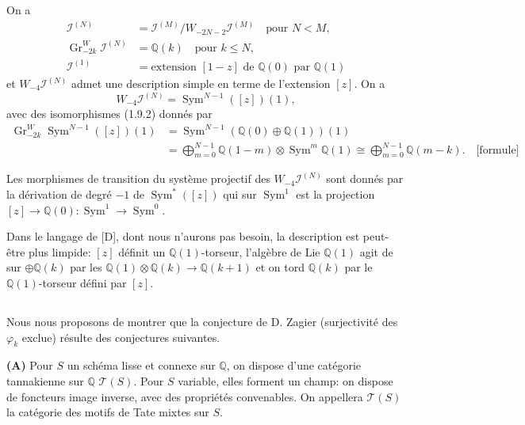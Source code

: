 \documentclass[12pt,a4paper]{article}
\theoremstyle{plain}
\theoremstyle{definition}
\theoremstyle{remark}
\DeclareMathOperator{\Sym}{Sym}
\newcommand{\Q}{\mathbb{Q}}
\begin{document}
On a
\begin{align}
\mathcal{I}^{(N)} &= \mathcal{I}^{(M)}/W_{-2N-2}\mathcal{I}^{(M)} \quad \text{pour }N<M, \tag{1.9.1}\label{eq:1.9.1}\\
\operatorname{Gr}^W_{-2k}\mathcal{I}^{(N)} &= \Q(k) \quad \text{pour }k\leq N, \tag{1.9.2}\label{eq:1.9.2}\\
\mathcal{I}^{(1)} &= \text{extension }[1-z]\text{ de }\Q(0)\text{ par }\Q(1) \tag{1.9.3}\label{eq:1.9.3}
\end{align}
et $W_{-4}\mathcal{I}^{(N)}$ admet une description simple en terme de l'extension $[z]$. On a
\begin{equation*}
W_{-4}\mathcal{I}^{(N)} = \Sym^{N-1}([z])(1),
\end{equation*}
avec des isomorphismes (1.9.2) donn{\'e}s par
\begin{equation}\label{eq:1.9.4}
\begin{aligned}
\operatorname{Gr}^W_{-2k}\Sym^{N-1}([z])(1) &= \Sym^{N-1}(\Q(0)\oplus\Q(1))(1)\\
&= \bigoplus_{m=0}^{N-1}\Q(1-m)\otimes\Sym^m\Q(1) \cong \bigoplus_{m=0}^{N-1}\Q(m-k).\quad \text{[formule]}
\end{aligned}
\tag{1.9.4}
\end{equation}

Les morphismes de transition du syst{\`e}me projectif des $W_{-4}\mathcal{I}^{(N)}$ sont donn{\'e}s par la d{\'e}rivation de degr{\'e} $-1$ de $\Sym^*([z])$ qui sur $\Sym^1$ est la projection $[z]\to\Q(0):\Sym^1\to\Sym^0$.

Dans le langage de [D], dont nous n'aurons pas besoin, la description est peut-\^etre plus limpide: $[z]$ d{\'e}finit un $\Q(1)$-torseur, l'alg{\`e}bre de Lie $\Q(1)$ agit de sur $\oplus\Q(k)$ par les $\Q(1)\otimes\Q(k)\to\Q(k+1)$ et on tord $\Q(k)$ par le $\Q(1)$-torseur d{\'e}fini par $[z]$.

\subsection{}

Nous nous proposons de montrer que la conjecture de D. Zagier (surjectivit{\'e} des $\varphi_k$ exclue) r{\'e}sulte des conjectures suivantes.

\textbf{(A)} Pour $S$ un sch{\'e}ma lisse et connexe sur $\Q$, on dispose d'une cat{\'e}gorie tannakienne sur $\Q$ $\mathcal{T}(S)$. Pour $S$ variable, elles forment un champ: on dispose de foncteurs image inverse, avec des propri{\'e}t{\'e}s convenables. On appellera $\mathcal{T}(S)$ la cat{\'e}gorie des motifs de Tate mixtes sur $S$.
\end{document}
